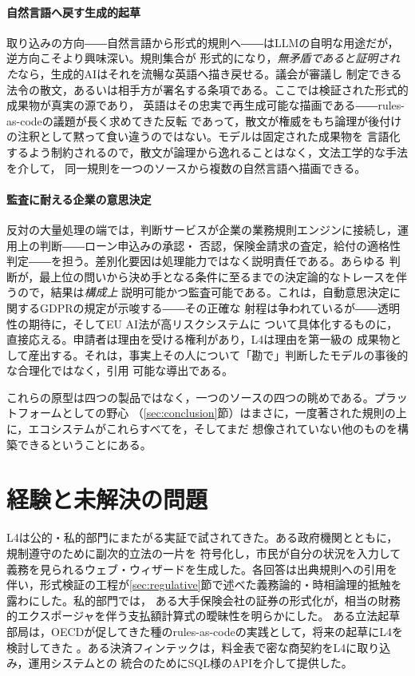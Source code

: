 \documentclass[11pt,a4paper]{ltjsarticle}
\begin{document}
\paragraph{自然言語へ戻す生成的起草}
取り込みの方向――自然言語から形式的規則へ――はLLMの自明な用途だが，逆方向こそより興味深い。規則集合が
形式的になり，\emph{無矛盾であると証明された}なら，生成的AIはそれを流暢な英語へ描き戻せる。議会が審議し
制定できる法令の散文，あるいは相手方が署名する条項である。ここでは検証された形式的成果物が真実の源であり，
英語はその忠実で再生成可能な描画である――rules-as-codeの議題が長く求めてきた反転\cite{mohun2020rulesascode}
であって，散文が権威をもち論理が後付けの注釈として黙って食い違うのではない。モデルは固定された成果物を
言語化するよう制約されるので，散文が論理から逸れることはなく，文法工学的な手法\cite{ranta2004gf}を介して，
同一規則を一つのソースから複数の自然言語へ描画できる。

\paragraph{監査に耐える企業の意思決定}
反対の大量処理の端では，判断サービスが企業の業務規則エンジンに接続し，運用上の判断――ローン申込みの承認・
否認，保険金請求の査定，給付の適格性判定――を担う。差別化要因は処理能力ではなく説明責任である。あらゆる
判断が，最上位の問いから決め手となる条件に至るまでの決定論的なトレースを伴うので，結果は\emph{構成上}
説明可能かつ監査可能である。これは，自動意思決定に関するGDPRの規定が示唆する\cite{gdpr2016}――その正確な
射程は争われているが\cite{wachter2017explanation}――透明性の期待に，そしてEU AI法が高リスクシステムに
ついて具体化するもの\cite{aiact2024}に，直接応える。申請者は理由を受ける権利があり，L4は理由を第一級の
成果物として産出する。それは，事実上その人について「勘で」判断したモデルの事後的な合理化ではなく，引用
可能な導出である。

これらの原型は四つの製品ではなく，一つのソースの四つの眺めである。プラットフォームとしての野心
（\ref{sec:conclusion}節）はまさに，一度著された規則の上に，エコシステムがこれらすべてを，そしてまだ
想像されていない他のものを構築できるということにある。

\section{経験と未解決の問題}\label{sec:experience}
L4は公的・私的部門にまたがる実証で試されてきた。ある政府機関とともに，規制遵守のために副次的立法の一片を
符号化し，市民が自分の状況を入力して義務を見られるウェブ・ウィザードを生成した。各回答は出典規則への引用を
伴い，形式検証の工程が\ref{sec:regulative}節で述べた義務論的・時相論理的抵触を露わにした。私的部門では，
ある大手保険会社の証券の形式化が，相当の財務的エクスポージャを伴う支払額計算式の曖昧性を明らかにした。
ある立法起草部局は，OECDが促してきた種のrules-as-codeの実践として，将来の起草にL4を検討してきた
\cite{mohun2020rulesascode}。ある決済フィンテックは，料金表で密な商契約をL4に取り込み，運用システムとの
統合のためにSQL様のAPIを介して提供した。
\end{document}
